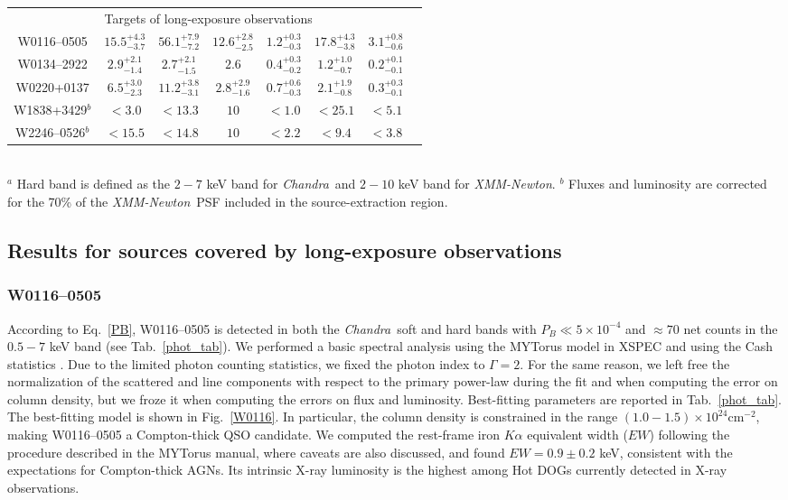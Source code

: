 \documentclass[useAMS,usenatbib]{mnras}
\newcommand*{\xmm}{\textit{\mbox{XMM-Newton}}}
\newcommand*{\chandra}{\textit{Chandra}}
\newcommand*{\nhunits}{\mathrm{cm^{-2}}}
\begin{document}
\begin{table*}
\begin{tabular}{cccccccc}
		\multicolumn{7}{c}{Targets of long-exposure observations}\\		
		W0116--0505           & $15.5^{+4.3}_{-3.7}$ & $56.1^{+7.9}_{-7.2}$ & $12.6^{+2.8}_{-2.5}$&    $1.2^{+0.3}_{-0.3}$ & $17.8^{+4.3}_{-3.8}$ &$3.1^{+0.8}_{-0.6}$\\
		W0134--2922           & $2.9^{+2.1}_{-1.4}$ & $2.7^{+2.1}_{-1.5}$     & $2.6$ &     $0.4^{+0.3}_{-0.2}$ & $1.2^{+1.0}_{-0.7}$&  $0.2^{+0.1}_{-0.1}$\\
		W0220+0137            & $6.5^{+3.0}_{-2.3}$ & $11.2^{+3.8}_{-3.1}$ & $2.8^{+2.9}_{-1.6}$ &    $0.7^{+0.6}_{-0.3}$ & $2.1^{+1.9}_{-0.8}$  &  $0.3^{+0.3}_{-0.1}$\\
		W1838+3429$^{b}$  & $<3.0$ & $<13.3$ &   $10$ &  $<1.0$ & $<25.1$    & $<5.1$\\
		W2246--0526$^{b}$ & $<15.5$ & $<14.8$ &   $10$ & $<2.2$ & $<9.4$   &  $<3.8$\\		         
		\hline
	\end{tabular}\\
$^a$ Hard band is defined as the $2-7$ keV band for \chandra\, and $2-10$ keV band for \xmm. 
$^b$ Fluxes and luminosity are corrected for the 70\% of the \xmm\, PSF included in the source-extraction region.
\end{table*}





\subsection{Results for sources covered by long-exposure observations }\label{results_indiv}

\subsubsection{W0116--0505}
According to Eq.~\ref{PB}, W0116--0505 is detected in both the \chandra\, soft and hard bands with \mbox{$P_B\ll5\times10^{-4}$} and $\approx70$ net counts in the $0.5-7$ keV band (see Tab.~\ref{phot_tab}). We performed a basic spectral analysis using the MYTorus model in XSPEC and using the Cash statistics \citep{Cash79}. Due to the limited photon counting statistics, we fixed the photon index to $\Gamma=2$. 
For the same reason, we left free the normalization of the scattered and line components with respect to the primary power-law during the fit and when computing the error on column density, but we froze it when computing the errors on flux and luminosity. Best-fitting parameters are reported in Tab.~\ref{phot_tab}. The best-fitting model is shown in Fig.~\ref{W0116}. In particular, the column density is constrained in the range $(1.0-1.5)\times10^{24}\nhunits$, making W0116--0505 a Compton-thick QSO candidate. We computed the rest-frame iron $K\alpha$ equivalent width ($EW$) following the procedure described in the MYTorus manual, where caveats are also discussed, and found $EW=0.9\pm0.2$ keV, consistent with the expectations for Compton-thick AGNs. Its intrinsic X-ray luminosity is the highest among Hot DOGs currently detected in X-ray observations.
\end{document}
